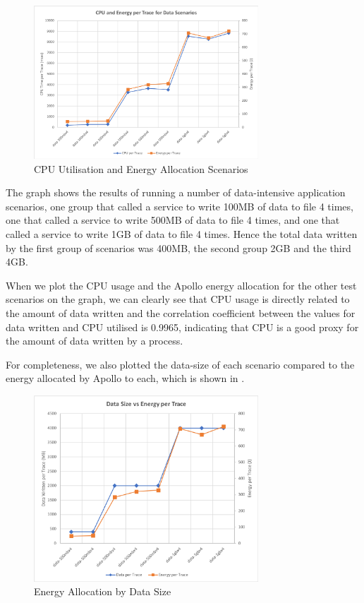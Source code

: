 \begin{figure}
\centering
\includegraphics[width=0.75\textwidth,trim={2 2 2 2},clip]{Figures/validation-traceenergydatasize}
\caption{CPU Utilisation and Energy Allocation Scenarios}
\label{figure:validation-traceenergydatasize}
\end{figure}

The graph shows the results of running a number of data-intensive application scenarios, one group that called a service to write 100MB of data to file 4 times, one that called a service to write 500MB of data to file 4 times, and one that called a service to write 1GB of data to file 4 times.  Hence the total data written by the first group of scenarios was 400MB, the second group 2GB and the third 4GB.

When we plot the CPU usage and the Apollo energy allocation for the other test scenarios on the graph, we can clearly see that CPU usage is directly related to the amount of data written and the correlation coefficient between the values for data written and CPU utilised is 0.9965, indicating that CPU is a good proxy for the amount of data written by a process.

For completeness, we also plotted the data-size of each scenario compared to the energy allocated by Apollo to each, which is shown in .  

\begin{figure}
\centering
\includegraphics[width=0.75\textwidth,trim={2 2 2 2},clip]{Figures/validation-energybydatasize}
\caption{Energy Allocation by Data Size}
\label{figure:validation-energybydatasize}
\end{figure}

